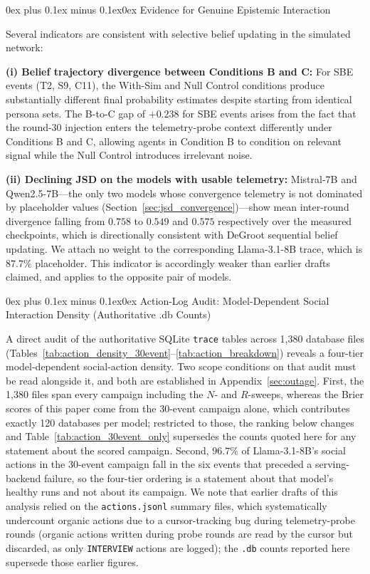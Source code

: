 \documentclass[11pt,journal,onecolumn]{IEEEtran}
\makeatletter
\renewcommand\subsubsection{\@startsection{subsubsection}{3}{\parindent}%
  {0ex plus 0.1ex minus 0.1ex}{0ex}%
  {\normalfont\normalsize\bfseries\itshape}}
\makeatother
\begin{document}
\subsubsection{Evidence for Genuine Epistemic Interaction}

Several indicators are consistent with selective belief updating in the simulated network:

\textbf{(i) Belief trajectory divergence between Conditions B and C:} For SBE events (T2, S9, C11), the With-Sim and Null Control conditions produce substantially different final probability estimates despite starting from identical persona sets. The B-to-C gap of $+0.238$ for SBE events arises from the fact that the round-30 injection enters the telemetry-probe context differently under Conditions B and C, allowing agents in Condition B to condition on relevant signal while the Null Control introduces irrelevant noise.

\textbf{(ii) Declining JSD on the models with usable telemetry:} Mistral-7B and Qwen2.5-7B---the only two models whose convergence telemetry is not dominated by placeholder values (Section~\ref{sec:jsd_convergence})---show mean inter-round divergence falling from $0.758$ to $0.549$ and $0.575$ respectively over the measured checkpoints, which is directionally consistent with DeGroot sequential belief updating. We attach no weight to the corresponding Llama-3.1-8B trace, which is $87.7\%$ placeholder. This indicator is accordingly weaker than earlier drafts claimed, and applies to the opposite pair of models.

\subsubsection{Action-Log Audit: Model-Dependent Social Interaction Density (Authoritative .db Counts)}

A direct audit of the authoritative SQLite \texttt{trace} tables across 1,380 database files (Tables~\ref{tab:action_density_30event}--\ref{tab:action_breakdown}) reveals a four-tier model-dependent social-action density. Two scope conditions on that audit must be read alongside it, and both are established in Appendix~\ref{sec:outage}. First, the 1,380 files span every campaign including the $N$- and $R$-sweeps, whereas the Brier scores of this paper come from the 30-event campaign alone, which contributes exactly 120 databases per model; restricted to those, the ranking below changes and Table~\ref{tab:action_30event_only} supersedes the counts quoted here for any statement about the scored campaign. Second, $96.7\%$ of Llama-3.1-8B's social actions in the 30-event campaign fall in the six events that preceded a serving-backend failure, so the four-tier ordering is a statement about that model's healthy runs and not about its campaign. We note that earlier drafts of this analysis relied on the \texttt{actions.jsonl} summary files, which systematically undercount organic actions due to a cursor-tracking bug during telemetry-probe rounds (organic actions written during probe rounds are read by the cursor but discarded, as only \texttt{INTERVIEW} actions are logged); the \texttt{.db} counts reported here supersede those earlier figures.
\end{document}
